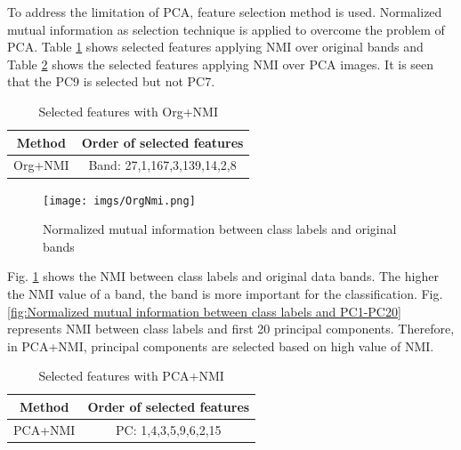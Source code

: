 \documentclass[document.tex]{subfiles}
\begin{document}
To address the limitation of PCA, feature selection method is used. Normalized mutual information as selection technique is applied to overcome the problem of PCA. Table \ref{tab:Selected features with Org+NMI} shows selected features applying NMI over original bands and Table \ref{tab:Selected features with PCA+NMI} shows the selected features applying NMI over PCA images. It is seen that the PC9 is selected but not PC7. 
\begin{table}[H]
	\caption{Selected features with Org+NMI}
	\begin{center}
		\begin{tabular}{|c|c|}
			\hline
			Method & Order of selected features\\ \hline
			Org+NMI & Band: 27,1,167,3,139,14,2,8\\ \hline
		\end{tabular}
	\end{center}
	\label{tab:Selected features with Org+NMI}
\end{table}
\begin{figure}[H]
	\begin{center}
		\texttt{[image: imgs/OrgNmi.png]}
	\end{center}
	\caption{Normalized mutual information between class labels and original bands}
	\label{fig:Normalized mutual information between class labels and original bands}
\end{figure}

\noindent Fig. \ref{fig:Normalized mutual information between class labels and original bands} shows the NMI between class labels and original data bands. The higher the NMI value of a band, the band is more important for the classification. Fig. \ref{fig:Normalized mutual information between class labels and PC1-PC20} represents NMI between class labels and first 20 principal components. Therefore, in PCA+NMI, principal components are selected based on high value of NMI. 

\begin{table}[H]
	\caption{Selected features with PCA+NMI}
	\begin{center}
		\begin{tabular}{|c|c|}
			\hline
			Method & Order of selected features\\ \hline
			PCA+NMI & PC: 1,4,3,5,9,6,2,15\\ \hline
		\end{tabular}
	\end{center}
	\label{tab:Selected features with PCA+NMI}
\end{table}
\end{document}
